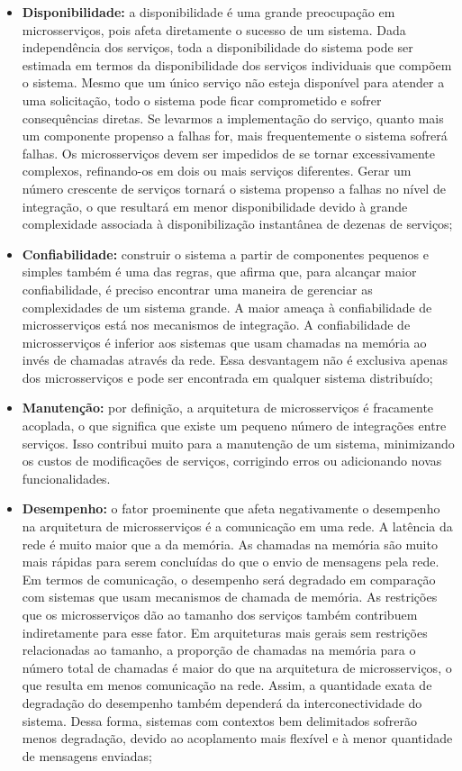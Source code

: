 \begin{itemize}
    \item \textbf{Disponibilidade:} a disponibilidade é uma grande preocupação em microsserviços, pois afeta diretamente o sucesso de um sistema. Dada independência dos serviços, toda a disponibilidade do sistema pode ser estimada em termos da disponibilidade dos serviços individuais que compõem o sistema. Mesmo que um único serviço não esteja disponível para atender a uma solicitação, todo o sistema pode ficar comprometido e sofrer consequências diretas. Se levarmos a implementação do serviço, quanto mais um componente propenso a falhas for, mais frequentemente o sistema sofrerá falhas. Os microsserviços devem ser impedidos de se tornar excessivamente complexos, refinando-os em dois ou mais serviços diferentes. Gerar um número crescente de serviços tornará o sistema propenso a falhas no nível de integração, o que resultará em menor disponibilidade devido à grande complexidade associada à disponibilização instantânea de dezenas de serviços;
    \item \textbf{Confiabilidade:} construir o sistema a partir de componentes pequenos e simples também é uma das regras, que afirma que, para alcançar maior confiabilidade, é preciso encontrar uma maneira de gerenciar as complexidades de um sistema grande. A maior ameaça à confiabilidade de microsserviços está nos mecanismos de integração. A confiabilidade de microsserviços é inferior aos sistemas que usam chamadas na memória ao invés de chamadas através da rede. Essa desvantagem não é exclusiva apenas dos microsserviços e pode ser encontrada em qualquer sistema distribuído; 
    \item \textbf{Manutenção:} por definição, a arquitetura de microsserviços é fracamente acoplada, o que significa que existe um pequeno número de integrações entre serviços. Isso contribui muito para a manutenção de um sistema, minimizando os custos de modificações de serviços, corrigindo erros ou adicionando novas funcionalidades.
    \item \textbf{Desempenho:} o fator proeminente que afeta negativamente o desempenho na arquitetura de microsserviços é a comunicação em uma rede. A latência da rede é muito maior que a da memória. As chamadas na memória são muito mais rápidas para serem concluídas do que o envio de mensagens pela rede. Em termos de comunicação, o desempenho será degradado em comparação com sistemas que usam mecanismos de chamada de memória. As restrições que os microsserviços dão ao tamanho dos serviços também contribuem indiretamente para esse fator. Em arquiteturas mais gerais sem restrições relacionadas ao tamanho, a proporção de chamadas na memória para o número total de chamadas é maior do que na arquitetura de microsserviços, o que resulta em menos comunicação na rede. Assim, a quantidade exata de degradação do desempenho também dependerá da interconectividade do sistema. Dessa forma, sistemas com contextos bem delimitados sofrerão menos degradação, devido ao acoplamento mais flexível e à menor quantidade de mensagens enviadas;

\end{itemize}
